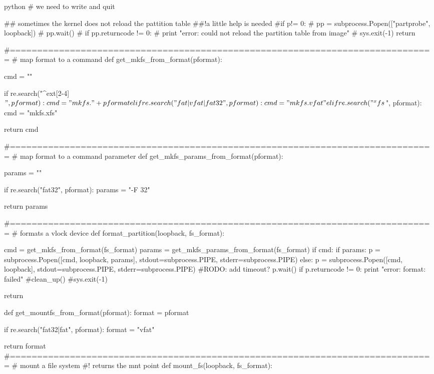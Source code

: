 \begin{code-block}{python}
    # we need to write and quit

    ## sometimes the kernel does not reload the pattition table
    ##!a little help is needed
    #if p!= 0:
    #    pp = subprocess.Popen(["partprobe", loopback])
    #    pp.wait()
    #    if pp.returncode != 0:
    #        print "error: could not reload the partition table from image"
    #        sys.exit(-1)
    return

#==============================================================================
# map format to a command
def get_mkfs_from_format(pformat):

    cmd = ""

    if re.search("^ext[2-4]$", pformat):
        cmd = "mkfs."+pformat
    elif re.search("fat|vfat|fat32", pformat):
        cmd = "mkfs.vfat"
    elif re.search("^xfs$", pformat):
        cmd = "mkfs.xfs"

    return cmd

#==============================================================================
# map format to a command parameter
def get_mkfs_params_from_format(pformat):

    params = ""

    if re.search("fat32", pformat):
        params = "-F 32"

    return params

#==============================================================================
# formats a vlock device
def format_partition(loopback, fs_format):

    cmd = get_mkfs_from_format(fs_format)
    params = get_mkfs_params_from_format(fs_format)
    if cmd:
        if params:
            p = subprocess.Popen([cmd, loopback, params],
                                 stdout=subprocess.PIPE, stderr=subprocess.PIPE)
        else:
            p = subprocess.Popen([cmd, loopback],
                                 stdout=subprocess.PIPE, stderr=subprocess.PIPE)
        #RODO: add timeout?
        p.wait()
        if p.returncode != 0:
            print "error: format: failed"
            #clean_up()
            #sys.exit(-1)

    return

def get_mountfs_from_format(pformat):
    format = pformat

    if re.search("fat32|fat", pformat):
        format = "vfat"

    return format
#==============================================================================
# mount a file system
#! returns the mnt point
def mount_fs(loopback, fs_format):


\end{code-block}
